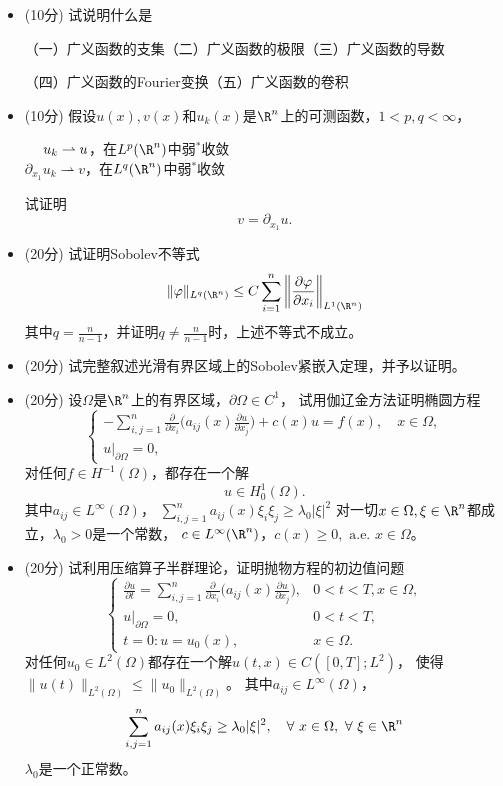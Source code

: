 \begin{itemize}
    \item[一] (10分) 试说明什么是

    （一）广义函数的支集\quad（二）广义函数的极限\quad（三）广义函数的导数

    （四）广义函数的Fourier变换\quad（五）广义函数的卷积
    \item[二] (10分) 假设$u(x),v(x)$和$u_k(x)$是$\R^n$上的可测函数，$1<p,q<\infty$，
    \begin{center}
        $\hspace{1.3em}u_k\rightharpoonup u$，\quad 在$L^p(\R^n)$中弱$^*$收敛\\
        $\partial_{x_1}u_k\rightharpoonup v$，\quad 在$L^q(\R^n)$中弱$^*$收敛
    \end{center}
    试证明
    \[v=\partial_{x_1}u.\]
    \item[三] (20分) 试证明Sobolev不等式
    \[\|\varphi\|_{L^q(\R^n)}\le C\sum_{i=1}^n
    \bigg\|\frac{\partial\varphi}{\partial x_i}\bigg\|_{L^1(\R^n)}\]
    其中$q=\frac{n}{n-1}$，并证明$q\ne\frac{n}{n-1}$时，上述不等式不成立。
    \item[四] (20分) 试完整叙述光滑有界区域上的Sobolev紧嵌入定理，并予以证明。
    \item[五] (20分) 设$\Omega$是$\R^n$上的有界区域，$\partial\Omega\in C^1$，
    试用伽辽金方法证明椭圆方程
    \[\begin{cases}
        \displaystyle-\sum_{i,j=1}^n\frac{\partial}{\partial x_i}
        \bigg(a_{ij}(x)\frac{\partial u}{\partial x_j}\bigg)
        +c(x)u=f(x),\quad x\in\Omega,\\
        u|_{\partial\Omega}=0,
    \end{cases}\]
    对任何$f\in H^{-1}(\Omega)$，都存在一个解
    \[u\in H_0^1(\Omega).\]
    其中$a_{ij}\in L^\infty(\Omega)$，
    $\sum\limits_{i,j=1}^na_{ij}(x)\xi_i\xi_j\ge\lambda_0|\xi|^2$
    对一切$x\in\Omega,\xi\in\R^n$都成立，$\lambda_0>0$是一个常数，
    $c\in L^\infty(\R^n)$，$c(x)\ge0,\text{ a.e. }x\in\Omega$。
    \item[六] (20分) 试利用压缩算子半群理论，证明抛物方程的初边值问题
    \[\begin{cases}
        \displaystyle\frac{\partial u}{\partial t}
        =\sum_{i,j=1}^n\frac{\partial}{\partial x_i}
        \bigg(a_{ij}(x)\frac{\partial u}{\partial x_j}\bigg),
        &0<t<T,x\in\Omega,\\
        u|_{\partial\Omega}=0,&0<t<T,\\
        t=0:u=u_0(x),&x\in\Omega.
    \end{cases}\]
    对任何$u_0\in L^2(\Omega)$都存在一个解$u(t,x)\in C([0,T];L^2)$，
    使得$\|u(t)\|_{L^2(\Omega)}\le\|u_0\|_{L^2(\Omega)}$。
    其中$a_{ij}\in L^\infty(\Omega)$，
    \[\sum\limits_{i,j=1}^na_{ij}(x)\xi_i\xi_j\ge\lambda_0|\xi|^2,
    \quad\forall\ x\in\Omega,\ \forall\ \xi\in\R^n\]
    $\lambda_0$是一个正常数。
\end{itemize}

